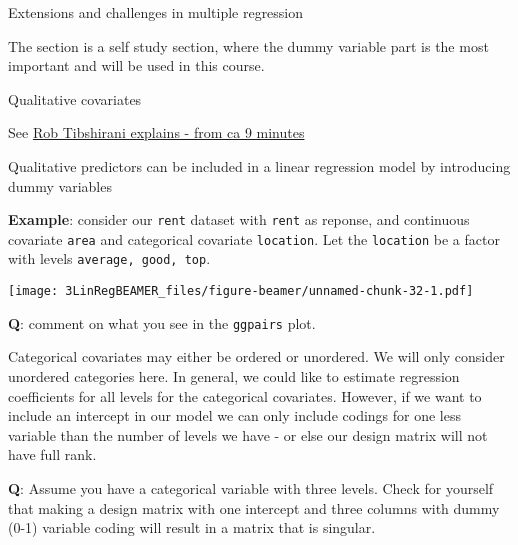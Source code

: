 \documentclass[ignorenonframetext,]{beamer}
\newenvironment{Shaded}{\begin{snugshade}}{\end{snugshade}}
\newcommand{\KeywordTok}[1]{\textcolor[rgb]{0.13,0.29,0.53}{\textbf{#1}}}
\newcommand{\StringTok}[1]{\textcolor[rgb]{0.31,0.60,0.02}{#1}}
\newcommand{\CommentTok}[1]{\textcolor[rgb]{0.56,0.35,0.01}{\textit{#1}}}
\newcommand{\OperatorTok}[1]{\textcolor[rgb]{0.81,0.36,0.00}{\textbf{#1}}}
\newcommand{\NormalTok}[1]{#1}
\begin{document}
\begin{frame}[fragile]{Extensions and challenges in multiple regression}

The section is a self study section, where the dummy variable part is
the most important and will be used in this course.

\begin{block}{Qualitative covariates}

See
\href{https://www.youtube.com/watch?v=3T6RXmIHbJ4\&index=4\&list=PL5-da3qGB5IBSSCPANhTgrw82ws7w_or9}{Rob
Tibshirani explains - from ca 9 minutes}

Qualitative predictors can be included in a linear regression model by
introducing dummy variables

\textbf{Example}: consider our \texttt{rent} dataset with \texttt{rent}
as reponse, and continuous covariate \texttt{area} and categorical
covariate \texttt{location}. Let the \texttt{location} be a factor with
levels \texttt{average,\ good,\ top}.

\footnotesize

\begin{Shaded}
\end{Shaded}

\texttt{[image: 3LinRegBEAMER\_files/figure-beamer/unnamed-chunk-32-1.pdf]}
\normalsize

\textbf{Q}: comment on what you see in the \texttt{ggpairs} plot.

\end{block}

\end{frame}

\begin{frame}

Categorical covariates may either be ordered or unordered. We will only
consider unordered categories here. In general, we could like to
estimate regression coefficients for all levels for the categorical
covariates. However, if we want to include an intercept in our model we
can only include codings for one less variable than the number of levels
we have - or else our design matrix will not have full rank.

\textbf{Q}: Assume you have a categorical variable with three levels.
Check for yourself that making a design matrix with one intercept and
three columns with dummy (0-1) variable coding will result in a matrix
that is singular.

\end{frame}
\end{document}
